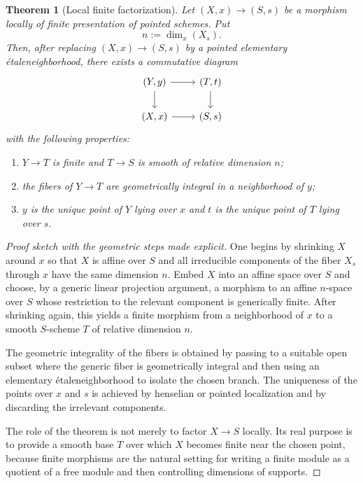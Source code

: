 \documentclass[11pt,oneside]{article}
\newtheorem{theorem}{Theorem}[section]
\newcommand{\etale}{\'etale}
\begin{document}
\begin{theorem}[Local finite factorization]\label{thm:zariski-local}
Let $(X,x)\to (S,s)$ be a morphism locally of finite presentation of pointed schemes.  Put
\[
n:=\dim_x(X_s).
\]
Then, after replacing $(X,x)\to(S,s)$ by a pointed elementary \etale neighborhood, there exists a commutative diagram
\[
\begin{tikzcd}
(Y,y) \ar[r] \ar[d] & (T,t) \ar[d]\\
(X,x) \ar[r] & (S,s)
\end{tikzcd}
\]
with the following properties:
\begin{enumerate}[label=\textup{(\alph*)}]
  \item $Y\to T$ is finite and $T\to S$ is smooth of relative dimension $n$;
  \item the fibers of $Y\to T$ are geometrically integral in a neighborhood of $y$;
  \item $y$ is the unique point of $Y$ lying over $x$ and $t$ is the unique point of $T$ lying over $s$.
\end{enumerate}
\end{theorem}

\begin{proof}[Proof sketch with the geometric steps made explicit]
One begins by shrinking $X$ around $x$ so that $X$ is affine over $S$ and all irreducible components of the fiber $X_s$ through $x$ have the same dimension $n$.  Embed $X$ into an affine space over $S$ and choose, by a generic linear projection argument, a morphism to an affine $n$-space over $S$ whose restriction to the relevant component is generically finite.  After shrinking again, this yields a finite morphism from a neighborhood of $x$ to a smooth $S$-scheme $T$ of relative dimension $n$.

The geometric integrality of the fibers is obtained by passing to a suitable open subset where the generic fiber is geometrically integral and then using an elementary \etale neighborhood to isolate the chosen branch.  The uniqueness of the points over $x$ and $s$ is achieved by henselian or pointed localization and by discarding the irrelevant components.

The role of the theorem is not merely to factor $X\to S$ locally.  Its real purpose is to provide a smooth base $T$ over which $X$ becomes finite near the chosen point, because finite morphisms are the natural setting for writing a finite module as a quotient of a free module and then controlling dimensions of supports.
\end{proof}
\end{document}
